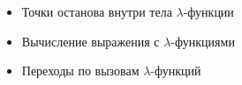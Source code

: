 \begin{frame}
\frametitle{\insertsection} 
\framesubtitle{\insertsubsection}
\begin{itemize}
	\item Точки останова внутри тела $\lambda$-функции
	\item Вычисление выражения с $\lambda$-функциями
	\item Переходы по вызовам $\lambda$-функций
\end{itemize}
\end{frame}
